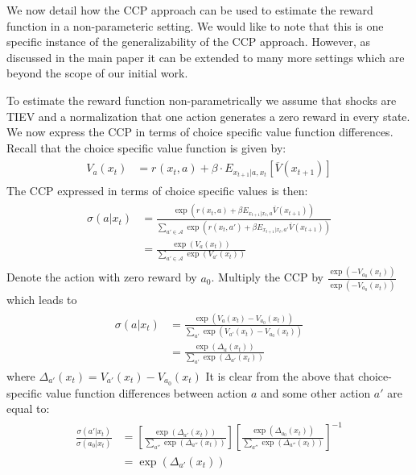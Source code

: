 \documentclass{article}
\begin{document}
We now detail how the CCP approach can be used to estimate the reward function in a non-parameteric setting. We would like to note that this is one specific instance of the generalizability of the CCP approach. However, as discussed in the main paper it can be extended to many more settings which are beyond the scope of our initial work.

To estimate the reward function non-parametrically we assume that shocks are TIEV and a normalization that one action generates a zero reward in every state. 
We now express the CCP in terms of choice specific value function differences. Recall that the choice specific value function is given by:
\begin{align}
\begin{split}
V_a(x_t) &= r_{}(x_t,a)+\beta  \cdot E_{x_{t+1}|a,x_t} \left[ \overline{V}(x_{t+1}) \right] 
\end{split}
\end{align}
The CCP expressed in terms of choice specific values is then:
\begin{align} 
\begin{split}
\sigma(a|x_t)&=\frac{\exp\left(r(x_t,a)+\beta E_{x_{t+1}|x_t,a} \overline{V}(x_{t+1})\right)}{\sum_{a'\in\mathcal{A}} \exp\left(r(x_t,a')+\beta E_{x_{t+1}|x_t,a'} \overline{V}(x_{t+1})\right)}\\
&=\frac{\exp(V_a(x_t))}{\sum_{a'\in\mathcal{A}} \exp(V_{a'}(x_t))}
\end{split}
\end{align}
Denote the action with zero reward by $a_0$. Multiply the CCP by $\frac{\exp(-V_{a_0}(x_t))}{\exp(-V_{a_0}(x_t))}$ which leads to  
\begin{align}
\begin{split}
\sigma(a|x_t)&=\frac{\exp(V_a(x_t)-V_{a_0}(x_t))}{\sum_{a'} \exp(V_{a'}(x_t)-V_{a_0}(x_t))}\\
&=\frac{\exp(\Delta_a(x_t))}{\sum_{a'} \exp(\Delta_{a'}(x_t))}
\end{split}
\end{align}
where $\Delta_{a'}(x_t)=V_{a'}(x_t)-V_{a_0}(x_t)$
It is clear from the above that choice-specific value function differences between action $a$ and some other action $a'$ are equal to:
\begin{align}\label{eq:ccp_ratio}
\begin{split}
\frac{\sigma(a'|x_t)}{\sigma(a_0|x_t)}&=
\left[
\frac
  {\exp(\Delta_{a'}(x_t))}
  {\sum_{a''} \exp(\Delta_{a''}(x_t))}
\right]
\left[\frac{\exp(\Delta_{a_0}(x_t))}{\sum_{a''} \exp(\Delta_{a''}(x_t))}\right]^{-1}\\
&=\exp(\Delta_{a'}(x_t))
\end{split}
\end{align}
\end{document}
